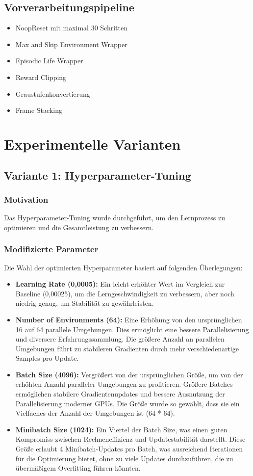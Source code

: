 \documentclass{article}
\begin{document}
\subsection{Vorverarbeitungspipeline}
\begin{itemize}
    \item NoopReset mit maximal 30 Schritten
    \item Max and Skip Environment Wrapper
    \item Episodic Life Wrapper
    \item Reward Clipping
    \item Graustufenkonvertierung
    \item Frame Stacking
\end{itemize}

\section{Experimentelle Varianten}

\subsection{Variante 1: Hyperparameter-Tuning}
\subsubsection{Motivation}
Das Hyperparameter-Tuning wurde durchgeführt, um den Lernprozess zu optimieren und die Gesamtleistung zu verbessern.

\subsubsection{Modifizierte Parameter}
Die Wahl der optimierten Hyperparameter basiert auf folgenden Überlegungen:
\begin{itemize}
\item \textbf{Learning Rate (0,0005):} Ein leicht erhöhter Wert im Vergleich zur Baseline (0,00025), um die Lerngeschwindigkeit zu verbessern, aber noch niedrig genug, um Stabilität zu gewährleisten.
\item \textbf{Number of Environments (64):} Eine Erhöhung von den ursprünglichen 16 auf 64 parallele Umgebungen. Dies ermöglicht eine bessere Parallelisierung und diversere Erfahrungssammlung. Die größere Anzahl an parallelen Umgebungen führt zu stabileren Gradienten durch mehr verschiedenartige Samples pro Update.
\item \textbf{Batch Size (4096):} Vergrößert von der ursprünglichen Größe, um von der erhöhten Anzahl paralleler Umgebungen zu profitieren. Größere Batches ermöglichen stabilere Gradientenupdates und bessere Ausnutzung der Parallelisierung moderner GPUs. Die Größe wurde so gewählt, dass sie ein Vielfaches der Anzahl der Umgebungen ist (64 * 64).
\item \textbf{Minibatch Size (1024):} Ein Viertel der Batch Size, was einen guten Kompromiss zwischen Rechneneffizienz und Updatestabilität darstellt. Diese Größe erlaubt 4 Minibatch-Updates pro Batch, was ausreichend Iterationen für die Optimierung bietet, ohne zu viele Updates durchzuführen, die zu übermäßigem Overfitting führen könnten.
\end{itemize}
\end{document}
